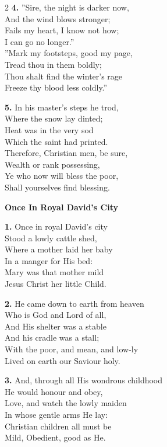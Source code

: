 \documentclass[a5paper,12pt]{article}
\begin{document}
\begin{multicols}{2}
\small
\textbf{4.} ''Sire, the night is darker now,\\
And the wind blows stronger;\\
Fails my heart, I know not how;\\
I can go no longer.''\\
''Mark my footsteps, good my page,\\
Tread thou in them boldly;\\
Thou shalt find the winter's rage\\
Freeze thy blood less coldly.''

\textbf{5.} In his master's steps he trod,\\
Where the snow lay dinted;\\
Heat was in the very sod\\
Which the saint had printed.\\
Therefore, Christian men, be sure,\\
Wealth or rank possessing,\\
Ye who now will bless the poor,\\
Shall yourselves find blessing.

\end{multicols}
\newpage

\begin{center}{\Large\bfseries Once In Royal David's City}\end{center}
\vspace{0.3em}
\textbf{1.} Once in royal David's city\\
Stood a lowly cattle shed,\\
Where a mother laid her baby\\
In a manger for His bed:\\
Mary was that mother mild\\
Jesus Christ her little Child.

\textbf{2.} He came down to earth from heaven\\
Who is God and Lord of all,\\
And His shelter was a stable\\
And his cradle was a stall;\\
With the poor, and mean, and low-ly\\
Lived on earth our Saviour holy.

\textbf{3.} And, through all His wondrous childhood\\
He would honour and obey,\\
Love, and watch the lowly maiden\\
In whose gentle arms He lay:\\
Christian children all must be\\
Mild, Obedient, good as He.
\end{document}
